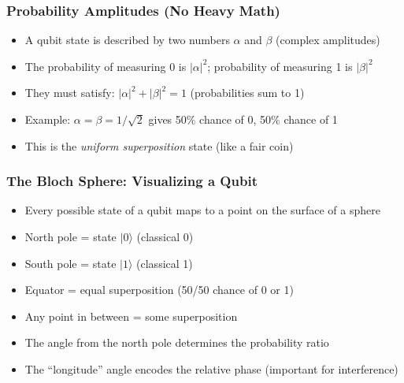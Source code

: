 \begin{frame}[fragile]\frametitle{Probability Amplitudes (No Heavy Math)}
\begin{itemize}
\item A qubit state is described by two numbers $\alpha$ and $\beta$ (complex amplitudes)
\item The probability of measuring 0 is $|\alpha|^2$; probability of measuring 1 is $|\beta|^2$
\item They must satisfy: $|\alpha|^2 + |\beta|^2 = 1$ (probabilities sum to 1)
\item Example: $\alpha = \beta = 1/\sqrt{2}$ gives 50\% chance of 0, 50\% chance of 1
\item This is the \textit{uniform superposition} state (like a fair coin)
\end{itemize}
\end{frame}

\begin{frame}[fragile]\frametitle{The Bloch Sphere: Visualizing a Qubit}
\begin{itemize}
\item Every possible state of a qubit maps to a point on the surface of a sphere
\item North pole = state $|0\rangle$ (classical 0)
\item South pole = state $|1\rangle$ (classical 1)
\item Equator = equal superposition (50/50 chance of 0 or 1)
\item Any point in between = some superposition
\item The angle from the north pole determines the probability ratio
\item The ``longitude'' angle encodes the relative phase (important for interference)
\end{itemize}
\end{frame}

